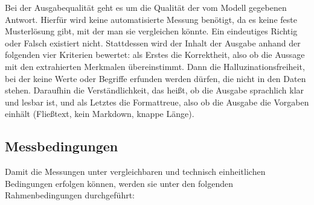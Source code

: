 \noindent Bei der Ausgabequalität geht es um die Qualität der vom Modell gegebenen Antwort. Hierfür wird keine automatisierte Messung benötigt, da es keine feste Musterlösung gibt, mit der man sie vergleichen könnte. Ein eindeutiges Richtig oder Falsch existiert nicht. Stattdessen wird der Inhalt der Ausgabe anhand der folgenden vier Kriterien bewertet: als Erstes die Korrektheit, also ob die Aussage mit den extrahierten Merkmalen übereinstimmt. Dann die Halluzinationsfreiheit, bei der keine Werte oder Begriffe erfunden werden dürfen, die nicht in den Daten stehen. Daraufhin die Verständlichkeit, das heißt, ob die Ausgabe sprachlich klar und lesbar ist, und als Letztes die Formattreue, also ob die Ausgabe die Vorgaben einhält (Fließtext, kein Markdown, knappe Länge).

\newpage
\subsection{Messbedingungen}
\label{subsec:messbedingungen}
Damit die Messungen unter vergleichbaren und technisch einheitlichen Bedingungen erfolgen können, werden sie unter den folgenden Rahmenbedingungen durchgeführt:
